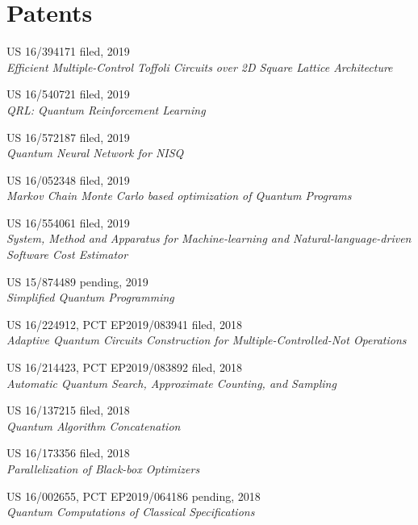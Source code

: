 \section{\sc Patents}

{\sc US 16/394171} \hfill {\sc filed}, 2019\\
\emph{Efficient Multiple-Control Toffoli Circuits over 2D Square Lattice Architecture}

{\sc US 16/540721} \hfill {\sc filed}, 2019\\
\emph{QRL: Quantum Reinforcement Learning}

{\sc US 16/572187} \hfill {\sc filed}, 2019\\
\emph{Quantum Neural Network for NISQ}

{\sc US 16/052348} \hfill {\sc filed}, 2019\\
\emph{Markov Chain Monte Carlo based optimization of Quantum Programs}

{\sc US 16/554061} \hfill {\sc filed}, 2019\\
\emph{System, Method and Apparatus for Machine-learning and Natural-language-driven \\Software Cost Estimator}

{\sc US 15/874489} \hfill {\sc pending}, 2019\\
\emph{Simplified Quantum Programming}

{\sc US 16/224912, PCT EP2019/083941} \hfill {\sc filed}, 2018\\
\emph{Adaptive Quantum Circuits Construction for Multiple-Controlled-Not Operations}

{\sc US 16/214423, PCT EP2019/083892} \hfill {\sc filed}, 2018\\
\emph{Automatic Quantum Search, Approximate Counting, and Sampling}

{\sc US 16/137215} \hfill {\sc filed}, 2018\\
\emph{Quantum Algorithm Concatenation}

{\sc US 16/173356} \hfill {\sc filed}, 2018\\
\emph{Parallelization of Black-box Optimizers}

{\sc US 16/002655, PCT EP2019/064186} \hfill {\sc pending}, 2018\\
\emph{Quantum Computations of Classical Specifications}

